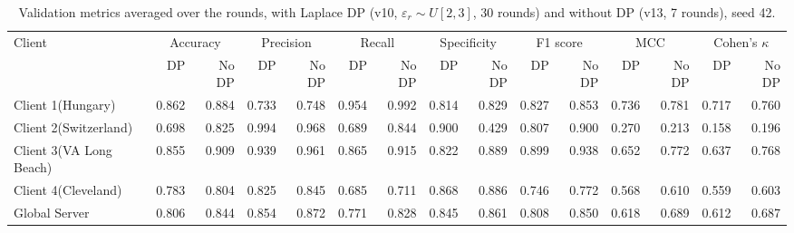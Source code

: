 \begin{table}[t]
\centering
\small
\caption{Validation metrics averaged over the rounds, with Laplace DP (v10, $\varepsilon_r\sim U[2,3]$, 30 rounds) and without DP (v13, 7 rounds), seed 42.}
\label{tab:dp_metrics}
\begin{tabular}{lrrrrrrrrrrrrrr}
\toprule
Client & \multicolumn{2}{c}{Accuracy} & \multicolumn{2}{c}{Precision} & \multicolumn{2}{c}{Recall} & \multicolumn{2}{c}{Specificity} & \multicolumn{2}{c}{F1 score} & \multicolumn{2}{c}{MCC} & \multicolumn{2}{c}{Cohen's $\kappa$} \\
 & DP & No DP & DP & No DP & DP & No DP & DP & No DP & DP & No DP & DP & No DP & DP & No DP \\
\midrule
Client 1(Hungary) & 0.862 & 0.884 & 0.733 & 0.748 & 0.954 & 0.992 & 0.814 & 0.829 & 0.827 & 0.853 & 0.736 & 0.781 & 0.717 & 0.760 \\
Client 2(Switzerland) & 0.698 & 0.825 & 0.994 & 0.968 & 0.689 & 0.844 & 0.900 & 0.429 & 0.807 & 0.900 & 0.270 & 0.213 & 0.158 & 0.196 \\
Client 3(VA Long Beach) & 0.855 & 0.909 & 0.939 & 0.961 & 0.865 & 0.915 & 0.822 & 0.889 & 0.899 & 0.938 & 0.652 & 0.772 & 0.637 & 0.768 \\
Client 4(Cleveland) & 0.783 & 0.804 & 0.825 & 0.845 & 0.685 & 0.711 & 0.868 & 0.886 & 0.746 & 0.772 & 0.568 & 0.610 & 0.559 & 0.603 \\
Global Server & 0.806 & 0.844 & 0.854 & 0.872 & 0.771 & 0.828 & 0.845 & 0.861 & 0.808 & 0.850 & 0.618 & 0.689 & 0.612 & 0.687 \\
\bottomrule
\end{tabular}
\end{table}
